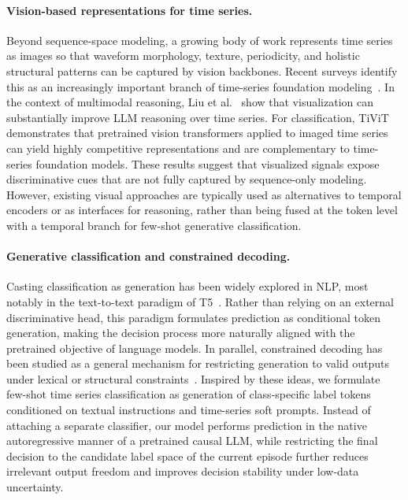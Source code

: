 \documentclass{article}
\begin{document}
    \paragraph{Vision-based representations for time series.}
    Beyond sequence-space modeling, a growing body of work represents time series as images so that waveform morphology, texture, periodicity, and holistic structural patterns can be captured by vision backbones. Recent surveys identify this as an increasingly important branch of time-series foundation modeling~\cite{ni2025harnessing}. In the context of multimodal reasoning, Liu et al.~\cite{liu2025picture} show that visualization can substantially improve LLM reasoning over time series. For classification, TiViT~\cite{roschmann2025time} demonstrates that pretrained vision transformers applied to imaged time series can yield highly competitive representations and are complementary to time-series foundation models. These results suggest that visualized signals expose discriminative cues that are not fully captured by sequence-only modeling. However, existing visual approaches are typically used as alternatives to temporal encoders or as interfaces for reasoning, rather than being fused at the token level with a temporal branch for few-shot generative classification.
    
    \paragraph{Generative classification and constrained decoding.}
    Casting classification as generation has been widely explored in NLP, most notably in the text-to-text paradigm of T5~\cite{raffel2020exploring}. Rather than relying on an external discriminative head, this paradigm formulates prediction as conditional token generation, making the decision process more naturally aligned with the pretrained objective of language models. In parallel, constrained decoding has been studied as a general mechanism for restricting generation to valid outputs under lexical or structural constraints~\cite{hokamp2017lexically,koo2024automata}. Inspired by these ideas, we formulate few-shot time series classification as generation of class-specific label tokens conditioned on textual instructions and time-series soft prompts. Instead of attaching a separate classifier, our model performs prediction in the native autoregressive manner of a pretrained causal LLM, while restricting the final decision to the candidate label space of the current episode further reduces irrelevant output freedom and improves decision stability under low-data uncertainty.
    
\end{document}
